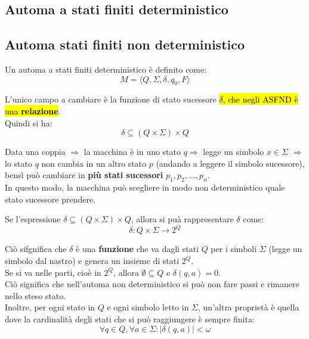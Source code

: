 \documentclass[12pt, a4paper, oneside]{book}
\begin{document}

  \subsection{Automa a stati finiti deterministico}

  \subsection{Automa stati finiti non deterministico}
  Un \textcolor{azzurrino}{automa a stati finiti deterministico} è definito come:
  \begin{equation*}
    M = \langle Q, \Sigma, \delta, q_0, F \rangle
  \end{equation*}

  L'unico campo a cambiare è la funzione di stato sucessore \hl{$\delta$, che negli ASFND è una \textbf{relazione}}. \\[0.2ex]
  Quindi si ha:
  \begin{equation*}
    \delta \subseteq (Q \times \Sigma) \times Q
  \end{equation*}

  Data una coppia $\Rightarrow$ la macchina è in uno stato $q \Rightarrow$ legge un simbolo $x \in \Sigma$ $\Rightarrow$ lo stato $q$ non cambia in un altro stato $p$ (andando a leggere il simbolo sucessore), bensì può cambiare in \textbf{più stati sucessori} $p_1, p_2, \dots, p_n$. \\[0.2ex]
  In questo modo, la macchina può scegliere in modo non deterministico quale stato sucessore prendere.

  Se l'espressione $\delta \subseteq (Q \times \Sigma) \times Q$, allora si puà rappresentare $\delta$ come:
  \begin{equation*}
    \delta : Q \times \Sigma \rightarrow 2^Q
  \end{equation*}

  Ciò sifgnifica che $\delta$ è una \textbf{funzione} che va dagli stati $Q$ per i simboli $\Sigma$ (legge un simbolo dal nastro) e genera un insieme di stati $2^Q$. \\[0.2ex]
  Se si va nelle parti, cioè in $2^Q$, allora $\emptyset \subseteq Q$ e $\delta(q,a) = 0$. \\[0.2ex]
  Ciò significa che nell'automa non deterministico si può non fare passi e rimanere nello steso stato. \\[0.2ex]
  Inoltre, per ogni stato in $Q$ e ogni simbolo letto in $\Sigma$, un'altra proprietà è quella dove la cardinalità degli stati che si può raggiungere è sempre finita:
  \begin{equation*}
    \forall q \in Q, \forall a \in \Sigma: |\delta(q, a)| < \omega
  \end{equation*}
\end{document}
